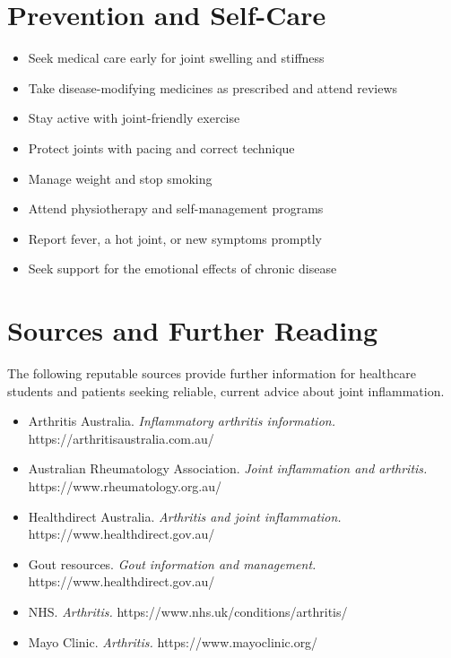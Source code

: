 \section*{Prevention and Self-Care}
\begin{itemize}
    \item Seek medical care early for joint swelling and stiffness
    \item Take disease-modifying medicines as prescribed and attend reviews
    \item Stay active with joint-friendly exercise
    \item Protect joints with pacing and correct technique
    \item Manage weight and stop smoking
    \item Attend physiotherapy and self-management programs
    \item Report fever, a hot joint, or new symptoms promptly
    \item Seek support for the emotional effects of chronic disease
\end{itemize}

\section*{Sources and Further Reading}
The following reputable sources provide further information for healthcare students and patients seeking reliable, current advice about joint inflammation.
\begin{itemize}
    \item Arthritis Australia. \textit{Inflammatory arthritis information.} https://arthritisaustralia.com.au/
    \item Australian Rheumatology Association. \textit{Joint inflammation and arthritis.} https://www.rheumatology.org.au/
    \item Healthdirect Australia. \textit{Arthritis and joint inflammation.} https://www.healthdirect.gov.au/
    \item Gout resources. \textit{Gout information and management.} https://www.healthdirect.gov.au/
    \item NHS. \textit{Arthritis.} https://www.nhs.uk/conditions/arthritis/
    \item Mayo Clinic. \textit{Arthritis.} https://www.mayoclinic.org/
\end{itemize}
